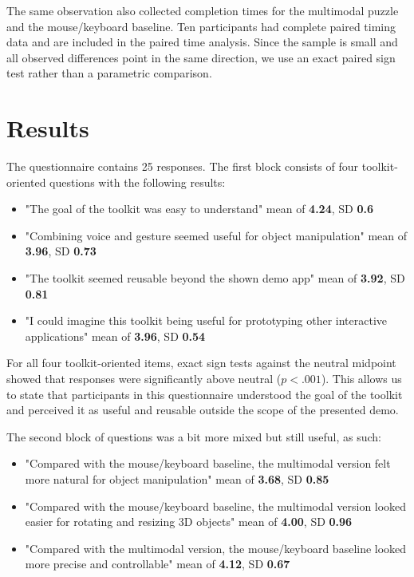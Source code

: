 \documentclass[sigconf]{acmart}
\begin{document}
The same observation also collected completion times for the multimodal puzzle
and the mouse/keyboard baseline. Ten participants had complete paired timing
data and are included in the paired time analysis. Since the sample is small
and all observed differences point in the same direction, we use an exact
paired sign test rather than a parametric comparison.

\section{Results}
The questionnaire contains 25 responses. The first block consists of
four toolkit-oriented questions with the following results:

\begin{itemize}
  \item "The goal of the toolkit was easy to understand" mean of \textbf{4.24}, SD \textbf{0.6}
  \item "Combining voice and gesture seemed useful for object manipulation" mean of \textbf{3.96}, SD \textbf{0.73}
  \item "The toolkit seemed reusable beyond the shown demo app" mean of \textbf{3.92}, SD \textbf{0.81}
  \item "I could imagine this toolkit being useful for prototyping other interactive applications" mean of \textbf{3.96},
  SD \textbf{0.54}
\end{itemize}

For all four toolkit-oriented items, exact sign tests against the neutral
midpoint showed that responses were significantly above neutral
(\(p < .001\)). This allows us to state that participants in this questionnaire
understood the goal of the toolkit and perceived it as useful and reusable outside
the scope of the presented demo.

The second block of questions was a bit more mixed but still useful, as such:

\begin{itemize}
  \item "Compared with the mouse/keyboard baseline, the multimodal version felt
  more natural for object manipulation" mean of \textbf{3.68}, SD
  \textbf{0.85}
  \item "Compared with the mouse/keyboard baseline, the multimodal version
  looked easier for rotating and resizing 3D objects" mean of \textbf{4.00},
  SD \textbf{0.96}
  \item "Compared with the multimodal version, the mouse/keyboard baseline
  looked more precise and controllable" mean of \textbf{4.12}, SD
  \textbf{0.67}
\end{itemize}
\end{document}
